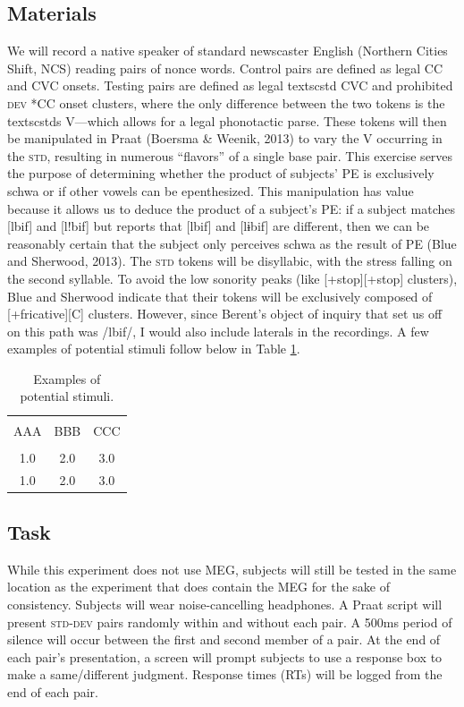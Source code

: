 \documentclass[jou,apacite]{apa6}
\begin{document}
    \subsection{Materials}
    We will record a native speaker of standard newscaster English (Northern Cities Shift, NCS) reading pairs of nonce words. Control pairs are defined as legal CC and CVC onsets. Testing pairs are defined as legal textsc{std} CVC and prohibited \textsc{dev} *CC onset clusters, where the only difference between the two tokens is the textsc{std}s V—which allows for a legal phonotactic parse. These tokens will then be manipulated in Praat (Boersma & Weenik, 2013) to vary the V occurring in the \textsc{std}, resulting in numerous “flavors” of a single base pair. This exercise serves the purpose of determining whether the product of subjects’ PE is exclusively schwa or if other vowels can be epenthesized. This manipulation has value because it allows us to deduce the product of a subject’s PE: if a subject matches [lbif] and [l!bif] but reports that [lbif] and [lɨbif] are different, then we can be reasonably certain that the subject only perceives schwa as the result of PE (Blue and Sherwood, 2013). The \textsc{std} tokens will be disyllabic, with the stress falling on the second syllable. To avoid the low sonority peaks (like [+stop][+stop] clusters), Blue and Sherwood indicate that their tokens will be exclusively composed of [+fricative][C] clusters. However, since Berent’s object of inquiry that set us off on this path was /lbif/, I would also include laterals in the recordings. A few examples of potential stimuli follow below in Table \ref{tab1}.


        \begin{table}[!htb]
        \caption{Examples of potential stimuli.}\label{tab1}
        \begin{tabular}{ccc}
        \hline\\[-1.5ex]
        AAA & BBB & CCC \\[0.5ex]
        \hline\\[-1.5ex]
        1.0 & 2.0 & 3.0\\[0.5ex]
        1.0 & 2.0 & 3.0\\[0.5ex]
        \hline
        \end{tabular}
        \end{table}

    \subsection{Task}
    While this experiment does not use MEG, subjects will still be tested in the same location as the experiment that does contain the MEG for the sake of consistency. Subjects will wear noise-cancelling headphones. A Praat script will present \textsc{std-dev} pairs randomly within and without each pair. A 500ms period of silence will occur between the first and second member of a pair. At the end of each pair’s presentation, a screen will prompt subjects to use a response box to make a same/different judgment. Response times (RTs) will be logged from the end of each pair.
\end{document}
